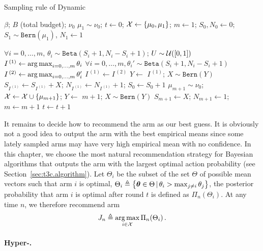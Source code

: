 \begin{algorithm}[ht]
\centering
\caption{Sampling rule of Dynamic \DTTTS{}}
\label{alg:dttts}
\begin{algorithmic}[1] %
     $\beta$; $B$ (total budget); $\nu_0$
     $\mu_1 \sim \nu_0$; $t \gets 0$; $\mathcal{X} \gets \{\mu_0,\mu_1\}$; $m\gets1$; $S_0, N_0 \gets 0$; $S_1 \sim \texttt{Bern}(\mu_1)$, $N_1 \gets 1$\
    
	    \State $\forall i=0,\dots,m$, $\theta_i \sim \texttt{Beta}(S_i+1,N_i-S_i+1)$; $U \sim \mathcal{U}([0,1])$
	    \State $I^{\,(1)} \gets \operatorname*{arg\,max}_{i=0,\dots,m} \theta_i$
	            \State $\forall i=0,\dots,m, \theta_i' \sim \texttt{Beta}(S_i+1,N_i-S_i+1)$
	            \State $I^{\,(2)} \leftarrow \operatorname*{arg\,max}_{i=0,\dots,m}\theta_i'$ 
	        \EndWhile
	        \State $I^{\,(1)} \gets I^{\,(2)}$
	    \EndIf
	        \State $Y \leftarrow$  $I^{\,(1)}$; $X \sim \texttt{Bern}(Y)$ 
	        \State $S_{I^{\,(1)}} \gets S_{I^{\,(1)}} + X$; $N_{I^{\,(1)}} \gets N_{I^{\,(1)}} + 1$; $S_0 \gets S_0 + 1$
	    \Else
            \State $\mu_{m+1}\sim \nu_0$; $\mathcal{X} \gets \mathcal{X} \cup \{\mu_{m+1}\}$; 
            \State $Y \leftarrow$  $m+1$; $X \sim \texttt{Bern}(Y)$
           	\State $S_{m+1} \gets X$; $N_{m+1}
           	\gets 1$; $m \gets m + 1$
 	   \EndIf
  	   \State $t\gets t+1$
    \EndWhile
\end{algorithmic}
\end{algorithm}

It remains to decide how to recommend the arm as our best guess. It is obviously not a good idea to output the arm with the best empirical means since some lately sampled arms may have very high empirical mean with no confidence. In this chapter, we choose the most natural recommendation strategy for Bayesian algorithms that outputs the arm with the largest optimal action probability (see Section~\ref{sec:t3c.algorithm}). Let $\Theta_i$ be the subset of the set $\Theta$ of possible mean vectors such that arm $i$ is optimal, $\Theta_i \triangleq \big\{ {\boldsymbol \theta}\in\Theta \,|\, \theta_i > \max_{j\neq i}\theta_j \big\}$, the posterior probability that arm $i$ is optimal after round $t$ is defined as $\Pi_{n}(\Theta_i)$. At any time $n$, we therefore recommend  arm 
\[
    J_n \triangleq \operatorname*{arg\,max}_{i\in\mathcal{X}} \Pi_{n}(\Theta_i)\,.
\]

\paragraph{Hyper-\TTTS{}.}

